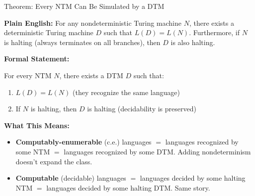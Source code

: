 \begin{definitionbox}{{Theorem: Every NTM Can Be Simulated by a DTM}}

\textbf{Plain English:}
For any nondeterministic Turing machine $N$, there exists a deterministic
Turing machine $D$ such that $L(D) = L(N)$. Furthermore, if $N$ is halting
(always terminates on all branches), then $D$ is also halting.

\textbf{Formal Statement:}

For every NTM $N$, there exists a DTM $D$ such that:
\begin{enumerate}[nosep]
\item $L(D) = L(N)$ \quad (they recognize the same language)
\item If $N$ is halting, then $D$ is halting \quad (decidability is preserved)
\end{enumerate}

\textbf{What This Means:}
\begin{itemize}[nosep]
\item \textbf{Computably-enumerable} (c.e.) languages $=$ languages recognized
  by some NTM $=$ languages recognized by some DTM. Adding nondeterminism
  doesn't expand the class.
\item \textbf{Computable} (decidable) languages $=$ languages decided by some
  halting NTM $=$ languages decided by some halting DTM. Same story.
\end{itemize}
\end{definitionbox}

